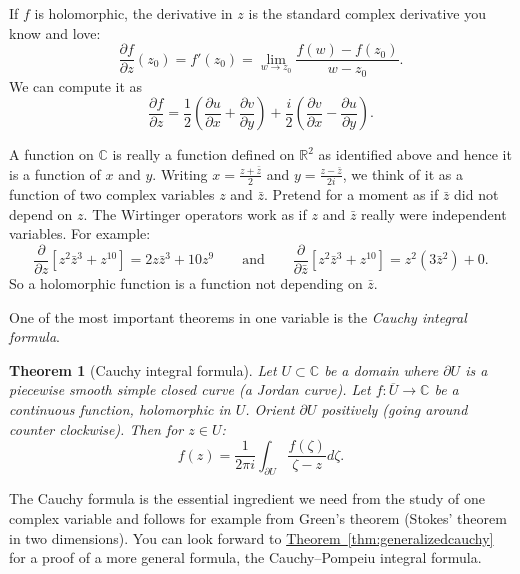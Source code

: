 \documentclass[12pt,openany]{book}
\newcommand{\C}{{\mathbb{C}}}
\newcommand{\R}{{\mathbb{R}}}
\newcommand{\myindex}[1]{#1\index{#1}}
\theoremstyle{plain}
\newtheorem{thm}{Theorem}[section]
\theoremstyle{remark}
\theoremstyle{definition}
\theoremstyle{exercise}
\theoremstyle{example}
\newcommand{\thmref}[1]{\hyperref[#1]{Theorem~\ref*{#1}}}
\begin{document}
If $f$ is holomorphic,
the derivative in $z$ is the standard complex derivative you know and love:
\begin{equation*}
\frac{\partial f}{\partial z} (z_0)
=
f'(z_0)
=
\lim_{w \to z_0} \frac{f(w)-f(z_0)}{w-z_0} .
\end{equation*}
We can compute it as
\begin{equation*}
\frac{\partial f}{\partial z} 
=
\frac{1}{2}
\left(
\frac{\partial u}{\partial x} 
+ \frac{\partial v}{\partial y}
\right)
+
\frac{i}{2}
\left( \frac{\partial v}{\partial x} - \frac{\partial u}{\partial y}
\right) .
\end{equation*}

A function on $\C$ is really a function defined on
$\R^2$ as identified above and hence it is a function of $x$ and $y$.
Writing
$x = \frac{z+\bar{z}}{2}$ and
$y = \frac{z-\bar{z}}{2i}$, we think of it as a function of two
complex variables $z$ and $\bar{z}$.  Pretend for a moment as if $\bar{z}$ did not
depend on $z$.
The Wirtinger operators
work as if $z$ and $\bar{z}$ really were independent variables.  For example:
\begin{equation*}
\frac{\partial}{\partial z}
\left[ z^2 \bar{z}^3 + z^{10} \right]
=
2z \bar{z}^3 + 10 z^{9}
\qquad
\text{and}
\qquad
\frac{\partial}{\partial \bar{z}}
\left[ z^2 \bar{z}^3 + z^{10} \right]
=
z^2 ( 3 \bar{z}^2 ) + 0 .
\end{equation*}
So a holomorphic function is a function not depending on $\bar{z}$.

One of the most important theorems in one variable is
the \emph{\myindex{Cauchy integral formula}}.

\begin{thm}[Cauchy integral formula]
Let $U \subset \C$ be a domain where $\partial U$ is a piecewise smooth
simple closed curve (a Jordan curve).  Let $f \colon \overline{U} \to \C$ be a continuous function,
holomorphic in $U$.
Orient $\partial U$ positively (going around counter clockwise).
Then for $z \in U$:
\begin{equation*}
f(z) =
\frac{1}{2\pi i}
\int_{\partial U}
\frac{f(\zeta)}{\zeta-z}
d \zeta .
\end{equation*}
\end{thm}

The Cauchy formula is the essential ingredient we need from the study of
one complex variable and follows for example
from Green's theorem (Stokes' theorem in two
dimensions).  You can look forward to
\thmref{thm:generalizedcauchy} for a proof of a more general formula,
the Cauchy--Pompeiu integral formula.
\end{document}
